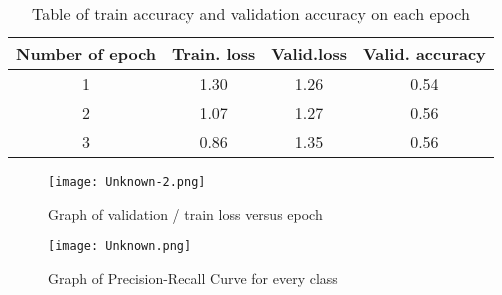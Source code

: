 \documentclass{article}
\begin{document}
\begin{table}[bhtp]
	\centering
	\caption{Table of train accuracy and validation accuracy on each epoch}
	\label{tbl:space_and_subspace}
	\begin{tabular}{| c | c | c | c | }
		\hline
		Number of epoch & Train. loss & Valid.loss & Valid. accuracy \\
		\hline
		1 & 1.30  & 1.26 & 0.54  \\
        \hline
		2 & 1.07 & 1.27 & 0.56  \\
		\hline
        3 & 0.86  & 1.35 & 0.56  \\
        \hline
	\end{tabular}
\end{table}

\begin{figure}[bhtp]
	\texttt{[image: Unknown-2.png]}
	\caption{Graph of validation / train loss versus epoch}
	\label{fig:1}
\end{figure}


\begin{figure}[bhtp]
	\texttt{[image: Unknown.png]}
	\caption{Graph of Precision-Recall Curve for every class}
	\label{fig:2}
\end{figure}


\pagebreak


\end{document}
